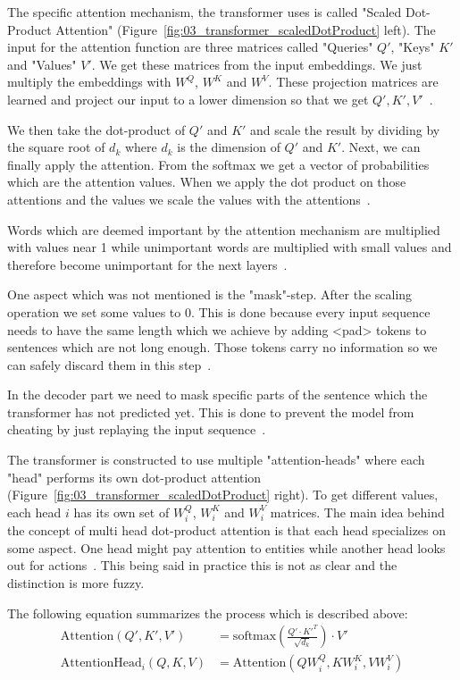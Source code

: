 The specific attention mechanism, the transformer uses is called "Scaled Dot-Product Attention" {(Figure~\ref{fig:03_transformer_scaledDotProduct} left)}. The input for the attention function are three matrices called "Queries" $Q'$, "Keys" $K'$ and "Values" $V'$. We get these matrices from the input embeddings. We just multiply the embeddings with $W^Q$, $W^K$ and $W^V$. These projection matrices are learned and project our input to a lower dimension so that we get $Q', K', V'$~\cite{Vaswani2017d}.
\bigskip

We then take the dot-product of $Q'$ and $K'$ and scale the result by dividing by the square root of $d_k$ where $d_k$ is the dimension of $Q'$ and $K'$. Next, we can finally apply the attention. From the softmax we get a vector of probabilities which are the attention values. When we apply the dot product on those attentions and the values we scale the values with the attentions~\cite{Vaswani2017d}. 
\medskip

Words which are deemed important by the attention mechanism are multiplied with values near 1 while unimportant words are multiplied with small values and therefore become unimportant for the next layers~\cite{Vaswani2017d}.
\medskip

One aspect which was not mentioned is the "mask"-step. After the scaling operation we set some values to 0. This is done because every input sequence needs to have the same length which we achieve by adding <pad> tokens to sentences which are not long enough. Those tokens carry no information so we can safely discard them in this step~\cite{Vaswani2017d}. 

In the decoder part we need to mask specific parts of the sentence which the transformer has not predicted yet. This is done to prevent the model from cheating by just replaying the input sequence~\cite{Vaswani2017d}.
\medskip

The transformer is constructed to use multiple "attention-heads" where each "head" performs its own dot-product attention {(Figure~\ref{fig:03_transformer_scaledDotProduct} right)}. To get different values, each head $i$ has its own set of $W_i^Q$, $W_i^K$ and $W_i^V$ matrices. The main idea behind the concept of multi head dot-product attention is that each head specializes on some aspect. One head might pay attention to entities while another head looks out for actions~\cite{Vaswani2017d}. This being said in practice this is not as clear and the distinction is more fuzzy.

The following equation summarizes the process which is described above:
\begin{align}
	\text{Attention}(Q', K', V') & = \text{softmax}(\frac{Q' \cdot K'^T}{\sqrt{d_k}}) \cdot V' \\
	\text{AttentionHead}_i(Q, K, V) & = \text{Attention}(QW_i^Q, KW_i^K, VW_i^V)
\end{align}


